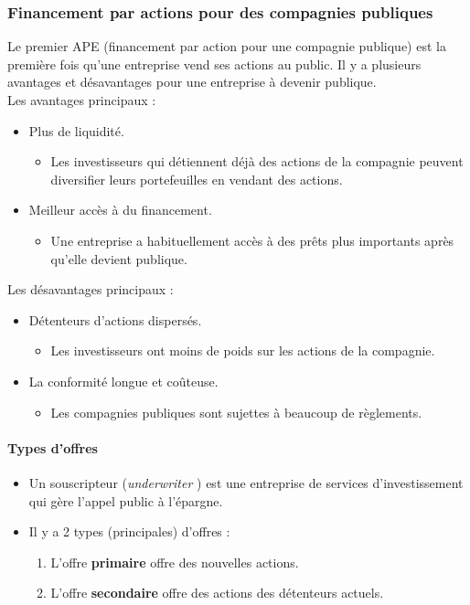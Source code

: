 \documentclass[10pt, french]{article}
\begin{document}
\begin{multicols*}{2}
\subsubsection{Financement par actions pour des compagnies publiques}
Le premier APE (financement par action pour une compagnie publique) est la première fois qu'une entreprise vend ses actions au public. Il y a plusieurs avantages et désavantages pour une entreprise à devenir publique.\\

Les avantages principaux : 
\begin{itemize}
	\item	Plus de liquidité.
		\begin{itemize}
		\item	Les investisseurs qui détiennent déjà des actions de la compagnie peuvent diversifier leurs portefeuilles en vendant des actions.
		\end{itemize}
	\item	Meilleur accès à du financement.
		\begin{itemize}
		\item	Une entreprise a habituellement accès à des prêts plus importants après qu'elle devient publique.
		\end{itemize}
\end{itemize}

Les désavantages principaux :
\begin{itemize}
	\item	Détenteurs d'actions dispersés.
		\begin{itemize}
		\item	Les investisseurs ont moins de poids sur les actions de la compagnie.
		\end{itemize}
	\item	La conformité longue et coûteuse.
		\begin{itemize}
		\item	Les compagnies publiques sont sujettes à beaucoup de règlements.
		\end{itemize}
\end{itemize}


\paragraph{Types d'offres}
\begin{itemize}
	\item	Un souscripteur (\og \textit{underwriter} \fg{}) est une entreprise de services d'investissement qui gère l'appel public à l'épargne.
	\item	Il y a 2 types (principales) d'offres : 
		\begin{enumerate}
		\item	L'offre \textbf{primaire} offre des nouvelles actions.
		\item	L'offre \textbf{secondaire} offre des actions des détenteurs actuels.
		\end{enumerate}
\end{itemize}


\end{multicols*}
\end{document}
